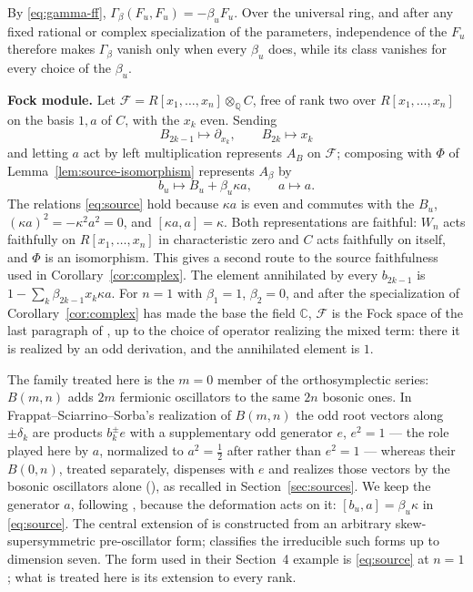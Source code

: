 \documentclass[11pt]{article}
\numberwithin{equation}{section}
\theoremstyle{remark}
\begin{document}
By \eqref{eq:gamma-ff}, $\Gamma_\beta(F_u,F_u)=-\beta_uF_u$. Over the
universal ring, and after any fixed rational or complex specialization of the
parameters, independence of the $F_u$ therefore makes $\Gamma_\beta$ vanish
only when every $\beta_u$ does, while its class vanishes for every choice of
the $\beta_u$.

\textbf{Fock module.} Let $\mathcal F=R[x_1,\ldots,x_n]\otimes_{\mathbb Q}C$, free of rank two over
$R[x_1,\ldots,x_n]$ on the basis $1,a$ of $C$, with the $x_k$ even.
Sending
\[
 B_{2k-1}\mapsto\partial_{x_k},\qquad B_{2k}\mapsto x_k
\]
and letting $a$ act by left multiplication represents $A_B$ on
$\mathcal F$; composing with $\Phi$ of
Lemma~\ref{lem:source-isomorphism} represents $A_\beta$ by
\[
 b_u\longmapsto B_u+\beta_u\kappa a,\qquad a\longmapsto a.
\]
The relations \eqref{eq:source} hold because $\kappa a$ is even and commutes
with the $B_u$, $(\kappa a)^2=-\kappa^2a^2=0$, and $[\kappa a,a]=\kappa$.
Both representations are faithful: $W_n$ acts faithfully on
$R[x_1,\ldots,x_n]$ in characteristic zero and $C$ acts faithfully on
itself, and $\Phi$ is an isomorphism. This gives a second route to the source
faithfulness used in Corollary~\ref{cor:complex}. The element annihilated by
every $b_{2k-1}$ is $1-\sum_{k}\beta_{2k-1}x_k\kappa a$. For $n=1$ with
$\beta_1=1$, $\beta_2=0$, and after the specialization of
Corollary~\ref{cor:complex} has made the base the field $\mathbb C$,
$\mathcal F$ is the Fock space of the last paragraph of
\cite[Section~4]{BS17}, up to the choice of operator realizing the mixed term:
there it is realized by an odd derivation, and the annihilated element is
$1$.

The family treated here is the $m=0$ member of the orthosymplectic series:
$B(m,n)$ adds $2m$ fermionic oscillators to the same $2n$ bosonic ones. In
Frappat--Sciarrino--Sorba's realization of $B(m,n)$ the odd root vectors along
$\pm\delta_k$ are products $b_k^{\pm}e$ with a supplementary odd generator
$e$, $e^2=1$ --- the role played here by $a$, normalized to $a^2=\tfrac{1}{2}$
after \cite{BS17} rather than $e^2=1$ --- whereas their $B(0,n)$, treated
separately, dispenses with $e$ and realizes those vectors by the bosonic
oscillators alone (\cite[\S2.30, pp.~219--220]{FSS00}), as recalled in
Section~\ref{sec:sources}. We keep the generator $a$, following \cite{BS17},
because the deformation acts on it: $[b_u,a]=\beta_u\kappa$ in
\eqref{eq:source}. The central extension of \cite[Section~4]{BS17} is
constructed from an arbitrary skew-supersymmetric pre-oscillator form;
\cite{BS17} classifies the irreducible such forms up to dimension seven.
The form used in their Section~4 example is \eqref{eq:source} at $n=1$;
what is treated here is its extension to every rank.
\end{document}
